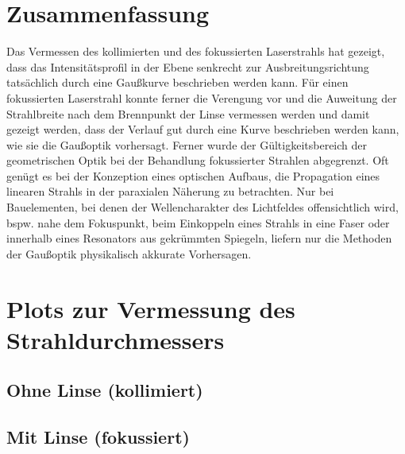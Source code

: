 \documentclass[11pt,a4paper,oneside]{scrartcl}
\begin{document}
\section{Zusammenfassung}
Das Vermessen des kollimierten und des fokussierten Laserstrahls hat gezeigt, dass das Intensitätsprofil in der Ebene senkrecht zur Ausbreitungsrichtung tatsächlich durch eine Gaußkurve beschrieben werden kann. Für einen fokussierten Laserstrahl konnte ferner die Verengung vor und die Auweitung der Strahlbreite nach dem Brennpunkt der Linse vermessen werden und damit gezeigt werden, dass der Verlauf gut durch eine Kurve beschrieben werden kann, wie sie die Gaußoptik vorhersagt. Ferner wurde der Gültigkeitsbereich der geometrischen Optik bei der Behandlung fokussierter Strahlen abgegrenzt. Oft genügt es bei der Konzeption eines optischen Aufbaus, die Propagation eines linearen Strahls in der paraxialen Näherung zu betrachten. Nur bei Bauelementen, bei denen der Wellencharakter des Lichtfeldes offensichtlich wird, bspw. nahe dem Fokuspunkt, beim Einkoppeln eines Strahls in eine Faser oder innerhalb eines Resonators aus gekrümmten Spiegeln, liefern nur die Methoden der Gaußoptik physikalisch akkurate Vorhersagen.
\newpage

 

\appendix


\section{Plots zur Vermessung des Strahldurchmessers}
\subsection{Ohne Linse (kollimiert)}
\subsection{Mit Linse (fokussiert)}
\end{document}
